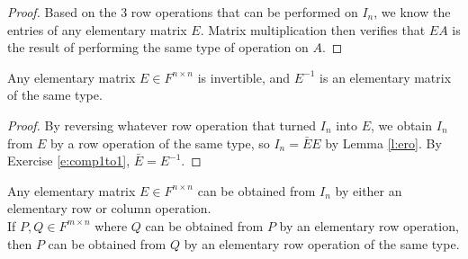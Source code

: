 \begin{proof}%
Based on the 3 row operations that can be performed on $I_n$, we know the entries of any elementary matrix $E$. Matrix multiplication then verifies that $EA$ is the result of performing the same type of operation on $A$.
\end{proof}
\begin{lem}\label{l:elem-inverse}
Any elementary matrix $E \in F^{n \times n}$ is invertible, and $E^{-1}$ is an elementary matrix of the same type.
\end{lem}
\begin{proof}
By reversing whatever row operation that turned $I_n$ into $E$, we obtain $I_n$ from $E$ by a row operation of the same type, so $I_n= \bar{E}E$ by Lemma \ref{l:ero}. By Exercise \ref{e:comp1to1}, $\bar{E}=E^{-1}$.
\end{proof}
\begin{exer}\label{e:ero-equiv-col}
Any elementary matrix $E \in F^{n \times n}$ can be obtained from $I_n$ by either an elementary row or column operation.\\
If $P,Q \in F^{m \times n}$ where $Q$ can be obtained from $P$ by an elementary row operation, then $P$ can be obtained from $Q$ by an elementary row operation of the same type.
\end{exer}

